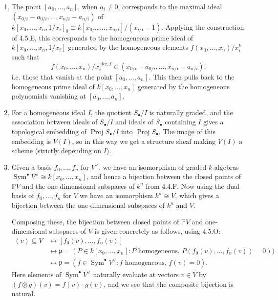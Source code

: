 \documentclass{report}
\newcommand{\dual}{\vee} %
\newcommand{\p}{\mathfrak{p}}
\renewcommand{\P}{\mathbb{P}} %
\DeclareMathOperator{\Sym}{Sym}
\DeclareMathOperator{\Proj}{Proj}
\begin{document}
\begin{enumerate}[label=\textbf{4.5.\Alph*.}]
	\item The point $[a_0,\ldots,a_n]$, when $a_i\ne0$, corresponds to the
	      maximal ideal $(x_{0/i}-a_{0/i},\ldots,x_{n/i}-a_{n/i})$ of
	      $k[x_0,\ldots,x_n,1/x_i]_0\cong k[x_{0/i},\ldots,x_{n/i}]/(x_{i/i}-1)$.
	      Applying the construction of 4.5.E, this corresponds to the
	      homogeneous prime ideal of $k[x_0,\ldots,x_n,1/x_i]$ generated by the
	      homogeneous elements $f(x_0,\ldots,x_n)/x_i^k$ such that
	      \begin{equation*}
		      f(x_0,\ldots,x_n)/x_i^{\deg f}
		      \in (x_{0/i}-a_{0/i},\ldots,x_{n/i}-a_{n/i});
	      \end{equation*}
	      i.e. those that vanish at the point $[a_0,\ldots,a_n]$. This then
	      pulls back to the homogeneous prime ideal of $k[x_0,\ldots,x_n]$
	      generated by the homogeneous polynomials vanishing at
	      $[a_0,\ldots,a_n]$.

	\item For a homogeneous ideal $I$, the quotient $S_\bullet/I$ is naturally
	      graded, and the association between ideals of $S_\bullet/I$ and ideals
	      of $S_\bullet$ containing $I$ gives a topological embedding of
	      $\Proj S_\bullet/I$ into $\Proj S_\bullet$. The image of this
	      embedding is $V(I)$, so in this way we get a structure sheaf making
	      $V(I)$ a scheme (strictly depending on $I$).

	\item Given a basis $f_0,\ldots,f_n$ for $V^\dual$, we have an isomorphism
	      of graded $k$-algebras $\Sym^\bullet V^\dual\cong k[x_0,\ldots,x_n]$,
	      and hence a bijection between the closed points of $\P V$ and the
	      one-dimensional subspaces of $k^n$ from 4.4.F. Now using the dual basis
	      of $f_0,\ldots,f_n$ for $V$ we have an isomorphism $k^n\cong V$, which
	      gives a bijection between the one-dimensional subspaces of $k^n$ and $V$.

	      Composing these, the bijection between closed points of $\P V$ and
	      one-dimensional subspaces of $V$ is given concretely as follows, using
	      4.5.O:
	      \begin{align*}
		      (v)\subseteq V
		       & \leftrightarrow [f_0(v),\ldots,f_n(v)]             \\
		       & \leftrightarrow
		      \p = (P\in k[x_0,\ldots,x_n] :
		      \text{$P$ homogeneous, $P(f_0(v),\ldots,f_n(v))=0$})) \\
		       & \leftrightarrow
		      \p = (f\in\Sym^\bullet V^\dual :
		      \text{$f$ homogeneous, $f(v)=0$}).
	      \end{align*}
	      Here elements of $\Sym^\bullet V^\dual$ naturally evaluate at vectors
	      $v\in V$ by $(f\otimes g)(v)=f(v)\cdot g(v)$, and we see that the
	      composite bijection is natural.
\end{enumerate}
\end{document}
